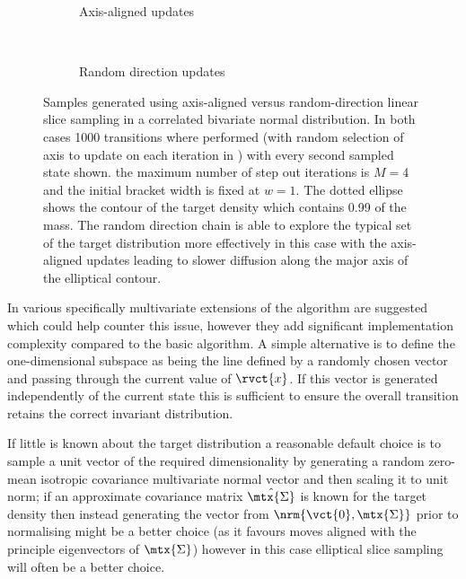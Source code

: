 \begin{figure}
\centering
\begin{subfigure}[b]{.46\linewidth}
\centering
  
  \vspace{-6mm}
  \caption{Axis-aligned updates}
  \label{sfig:axis-aligned-linear-slice-sampler}
\end{subfigure}
~~
\begin{subfigure}[b]{.46\linewidth}
\centering
  
  \vspace{-6mm}
  \caption{Random direction updates}
  \label{sfig:random-direction-linear-slice-sampler}
\end{subfigure}
  \caption[Linear slice sampler comparison.]{Samples generated using  axis-aligned versus  random-direction  linear slice sampling in a correlated bivariate normal distribution. In both cases 1000 transitions where performed (with random selection of axis to update on each iteration in ) with every second sampled state shown.  the maximum number of step out iterations is $M=4$ and the initial bracket width is fixed at $w=1$. The dotted ellipse shows the contour of the target density which contains 0.99 of the mass. The random direction chain is able to explore the typical set of the target distribution more effectively in this case with the axis-aligned updates leading to slower diffusion along the major axis of the elliptical contour.}
  \label{fig:linear-slice-sampler-comparison}
\end{figure}

In \citep{neal2003slice} various specifically multivariate extensions of the algorithm are suggested which could help counter this issue, however they add significant implementation complexity compared to the basic algorithm. A simple alternative is to define the one-dimensional subspace as being the line defined by a randomly chosen vector and passing through the current value of $\rvct{x}$. If this vector is generated independently of the current state this is sufficient to ensure the overall transition retains the correct invariant distribution. 

If little is known about the target distribution a reasonable default choice is to sample a unit vector of the required dimensionality by generating a random zero-mean isotropic covariance multivariate normal vector and then scaling it to unit norm; if an approximate covariance matrix $\hat{\mtx{\Sigma}}$ is known for the target density then instead generating the vector from $\nrm{\vct{0},\mtx{\Sigma}}$ prior to normalising might be a better choice (as it favours moves aligned with the principle eigenvectors of $\mtx{\Sigma}$) however in this case elliptical slice sampling will often be a better choice. 

